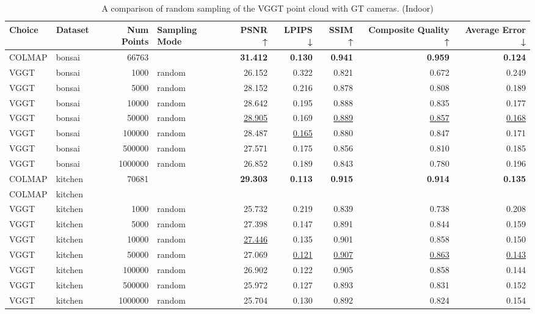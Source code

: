 \begin{table}[H]
\caption{\ifdefined\customcaption \customcaption \else A comparison of random sampling of the VGGT point cloud with GT cameras. (Indoor) \fi}
\label{tab:03_random_gt_cams_indoor}
\centering
\scriptsize
\begin{tabular}{llrlrrrrr}
\toprule
Choice & Dataset & Num Points & Sampling Mode & PSNR ↑ & LPIPS ↓ & SSIM ↑ & Composite Quality ↑ & Average Error ↓ \\
\midrule
COLMAP & bonsai & 66763 &  & \textbf{31.412} & \textbf{0.130} & \textbf{0.941} & \textbf{0.959} & \textbf{0.124} \\
VGGT & bonsai & 1000 & random & 26.152 & 0.322 & 0.821 & 0.672 & 0.249 \\
VGGT & bonsai & 5000 & random & 28.152 & 0.216 & 0.878 & 0.808 & 0.189 \\
VGGT & bonsai & 10000 & random & 28.642 & 0.195 & 0.888 & 0.835 & 0.177 \\
VGGT & bonsai & 50000 & random & \underline{28.905} & 0.169 & \underline{0.889} & \underline{0.857} & \underline{0.168} \\
VGGT & bonsai & 100000 & random & 28.487 & \underline{0.165} & 0.880 & 0.847 & 0.171 \\
VGGT & bonsai & 500000 & random & 27.571 & 0.175 & 0.856 & 0.810 & 0.185 \\
VGGT & bonsai & 1000000 & random & 26.852 & 0.189 & 0.843 & 0.780 & 0.196 \\
\midrule
COLMAP & kitchen & 70681 &  & \textbf{29.303} & \textbf{0.113} & \textbf{0.915} & \textbf{0.914} & \textbf{0.135} \\
COLMAP & kitchen &  &  &  &  &  &  &  \\
VGGT & kitchen & 1000 & random & 25.732 & 0.219 & 0.839 & 0.738 & 0.208 \\
VGGT & kitchen & 5000 & random & 27.398 & 0.147 & 0.891 & 0.844 & 0.159 \\
VGGT & kitchen & 10000 & random & \underline{27.446} & 0.135 & 0.901 & 0.858 & 0.150 \\
VGGT & kitchen & 50000 & random & 27.069 & \underline{0.121} & \underline{0.907} & \underline{0.863} & \underline{0.143} \\
VGGT & kitchen & 100000 & random & 26.902 & 0.122 & 0.905 & 0.858 & 0.144 \\
VGGT & kitchen & 500000 & random & 25.972 & 0.127 & 0.893 & 0.831 & 0.152 \\
VGGT & kitchen & 1000000 & random & 25.704 & 0.130 & 0.892 & 0.824 & 0.154 \\

\end{tabular}
\end{table}
